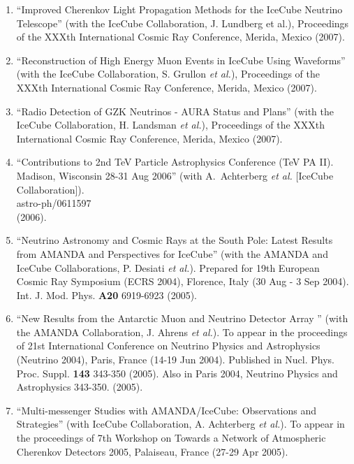 \begin{enumerate}
\item ``Improved Cherenkov Light Propagation Methods for the
        IceCube   Neutrino Telescope'' (with the IceCube
        Collaboration, J. Lundberg et   al.), Proceedings of
        the XXXth International Cosmic Ray Conference,
        Merida, Mexico (2007).

\item ``Reconstruction of High Energy Muon Events in IceCube
        Using   Waveforms'' (with the IceCube Collaboration,
        S. Grullon {\it et al.}),   Proceedings of the XXXth
        International Cosmic Ray Conference,   Merida,
        Mexico (2007).

\item ``Radio Detection of GZK Neutrinos - AURA Status and
        Plans'' (with   the IceCube Collaboration, H.
        Landsman {\it et al.}), Proceedings of the   XXXth
        International Cosmic Ray Conference, Merida, Mexico
        (2007).

\item ``Contributions to 2nd TeV Particle Astrophysics
        Conference (TeV PA   II). Madison, Wisconsin 28-31
        Aug 2006'' (with A.~Achterberg {\it et     al.}
        [IceCube Collaboration]).  \\{}astro-ph/0611597
        \\{}%
        (2006).

\item ``Neutrino Astronomy and Cosmic Rays at the South
        Pole: Latest   Results from AMANDA and Perspectives
        for IceCube'' (with the AMANDA   and IceCube
        Collaborations, P. Desiati {\it et al.}).  Prepared
        for 19th   European Cosmic Ray Symposium (ECRS
        2004), Florence, Italy (30 Aug -   3 Sep 2004).
        Int. J. Mod. Phys. {\bf A20} 6919-6923 (2005).

\item ``New Results from the Antarctic Muon and Neutrino
        Detector Array  '' (with the AMANDA Collaboration,
        J. Ahrens {\it et al.}).  To appear in the
        proceedings of 21st International Conference on
        Neutrino Physics and   Astrophysics (Neutrino 2004),
        Paris, France (14-19 Jun   2004). Published in Nucl.
        Phys. Proc. Suppl. {\bf 143} 343-350   (2005). Also
        in Paris 2004, Neutrino Physics and Astrophysics
        343-350. (2005).

\item ``Multi-messenger Studies with AMANDA/IceCube:
        Observations and   Strategies'' (with IceCube
        Collaboration, A. Achterberg {\it et al.}).  To
        appear in the proceedings of 7th Workshop on Towards
        a Network of   Atmospheric Cherenkov Detectors 2005,
        Palaiseau, France (27-29 Apr   2005).


\end{enumerate}
